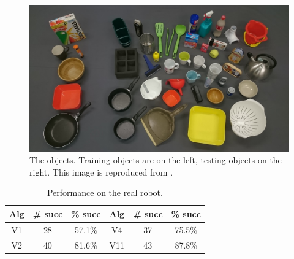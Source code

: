 
\begin{figure}[t]
\begin{center}
  \includegraphics[width=0.7\linewidth]{images/objects.jpg}
  \end{center}
  \caption{The objects. Training objects are on the left, testing objects on the right. This image is reproduced from \protect\cite{kopicki2019ijrr}.}
  \label{fig:real-objects}
\end{figure}

\begin{table}[b]
\small
\begin{center}
\caption{Performance on the real robot. \label{tab:robot-results}}
\begin{tabular}{|c|c|c|c|c|c|} \hline
Alg & \# succ & \% succ & Alg & \# succ & \% succ \\ \hline
V1  &  28 & 57.1\% & V4   & 37  & 75.5\% \\
V2  & 40 & 81.6\% & V11 & 43  & 87.8\% \\
\hline
\end{tabular}
\end{center}
\end{table}

